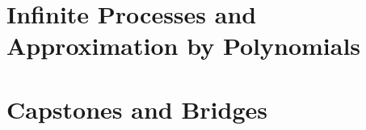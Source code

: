 \documentclass[11pt,letterpaper,openright,twoside]{book}
\begin{document}
\part{Infinite Processes and Approximation by Polynomials}



\part{Capstones and Bridges}


\appendix







\backmatter




\printindex
\end{document}
